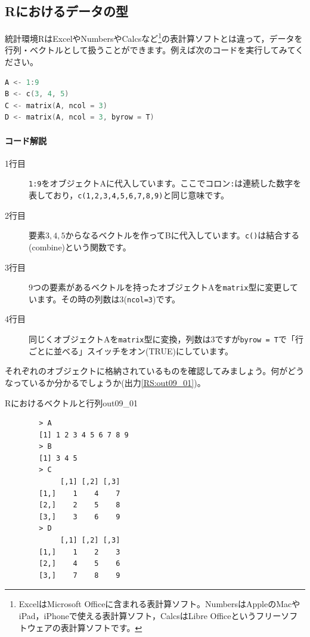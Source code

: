 \documentclass{ltjsbook}
\begin{document}
\subsection{Rにおけるデータの型}
統計環境RはExcelやNumbersやCalcsなど\footnote{ExcelはMicrosoft Officeに含まれる表計算ソフト。NumbersはAppleのMacやiPad，iPhoneで使える表計算ソフト，CalcsはLibre Officeというフリーソフトウェアの表計算ソフトです。}の表計算ソフトとは違って，データを行列・ベクトルとして扱うことができます。例えば次のコードを実行してみてください。

\begin{lstlisting}[language=c++,label={code::09_01},caption={ベクトルデータの保持}]
A <- 1:9
B <- c(3, 4, 5)
C <- matrix(A, ncol = 3)
D <- matrix(A, ncol = 3, byrow = T)
\end{lstlisting}

\paragraph{コード解説}
\begin{description}
    \item[1行目] \texttt{1:9}をオブジェクトAに代入しています。ここでコロン\verb|:|は連続した数字を表しており，\texttt{c(1,2,3,4,5,6,7,8,9)}と同じ意味です。
    \item[2行目] 要素$3,4,5$からなるベクトルを作ってBに代入しています。\texttt{c()}は結合する(combine)という関数です。
    \item[3行目] 9つの要素があるベクトルを持ったオブジェクトAを\texttt{matrix}型に変更しています。その時の列数は3(\texttt{ncol=3})です。
    \item[4行目] 同じくオブジェクトAを\texttt{matrix}型に変換，列数は3ですが\texttt{byrow = T}で「行ごとに並べる」スイッチをオン(TRUE)にしています。
\end{description}

それぞれのオブジェクトに格納されているものを確認してみましょう。何がどうなっているか分かるでしょうか(出力\ref{RS:out09_01})。

\begin{Rscreen}{Rにおけるベクトルと行列}{out09_01}
    \begin{verbatim}
        > A
        [1] 1 2 3 4 5 6 7 8 9
        > B
        [1] 3 4 5
        > C
             [,1] [,2] [,3]
        [1,]    1    4    7
        [2,]    2    5    8
        [3,]    3    6    9
        > D
             [,1] [,2] [,3]
        [1,]    1    2    3
        [2,]    4    5    6
        [3,]    7    8    9
    \end{verbatim}
\end{Rscreen}
\end{document}

